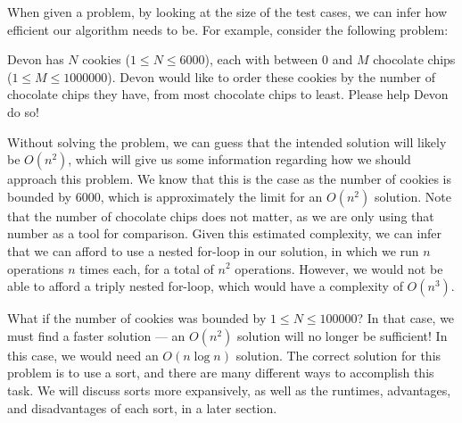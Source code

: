 \begin{comment}
\begin{itemize}
    \item $ n \leq 10$: $ O(n!) $
    \item $ n \leq 25$: $ O(2^n) $
    \item $ n \leq 50$: $ O(n^4) $
    \item $ n \leq 500$: $ O(n^3) $
    \item $ n \leq 5000$: $ O(n^2) $
    \item $ n \leq 100000$: $ O(n\log n) $
    \item $ n \leq 1000000$: $ O(n) $
\end{itemize}
\end{comment}

When given a problem, by looking at the size of the test cases, we can infer how efficient our algorithm needs to be.  For example, consider the following problem:

\begin{Problem}
Devon has $ N $ cookies ($ 1 \leq N \leq 6000 $), each with between $ 0 $ and $ M $ chocolate chips ($ 1 \leq M \leq 1000000 $).  Devon would like to order these cookies by the number of chocolate chips they have, from most chocolate chips to least.  Please help Devon do so!
\end{Problem}

Without solving the problem, we can guess that the intended solution will likely be $ O(n^2) $, which will give us some information regarding how we should approach this problem.  We know that this is the case as the number of cookies is bounded by $ 6000 $, which is approximately the limit for an $ O(n^2) $ solution.  Note that the number of chocolate chips does not matter, as we are only using that number as a tool for comparison.  Given this estimated complexity, we can infer that we can afford to use a nested for-loop in our solution, in which we run $ n $ operations $ n $ times each, for a total of $ n^2 $ operations. However, we would not be able to afford a triply nested for-loop, which would have a complexity of $ O(n^3) $.

What if the number of cookies was bounded by $ 1 \leq N \leq 100000 $?  In that case, we must find a faster solution --- an $ O(n^2) $ solution will no longer be sufficient! In this case, we would need an $ O(n\log n) $ solution.  The correct solution for this problem is to use a sort, and there are many different ways to accomplish this task.  We will discuss sorts more expansively, as well as the runtimes, advantages, and disadvantages of each sort, in a later section.
